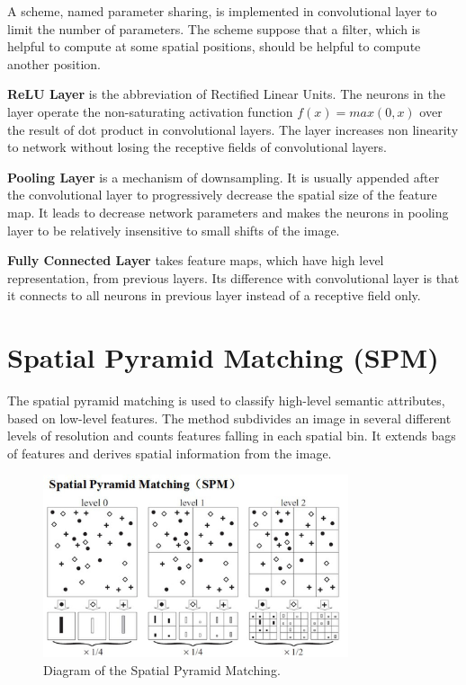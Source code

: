 A scheme, named parameter sharing, is implemented in convolutional layer to limit the number of parameters. The scheme suppose that a filter, which is helpful to compute at some spatial positions, should be helpful to compute another position.

\textbf{ReLU Layer} is the abbreviation of Rectified Linear Units. The neurons in the layer operate the non-saturating activation function $f(x) = max(0,x)$ over the result of dot product in convolutional layers. The layer increases non linearity to network without losing the receptive fields of convolutional layers.

\textbf{Pooling Layer} is a mechanism of downsampling. It is usually appended after the convolutional layer to progressively decrease the spatial size of the feature map. It leads to decrease network parameters and makes the neurons in pooling layer to be relatively insensitive to small shifts of the image.

\textbf{Fully Connected Layer} takes feature maps, which have high level representation, from previous layers. Its difference with convolutional layer is that it connects to all neurons in previous layer instead of a receptive field only.

\section{Spatial Pyramid Matching (SPM)}

The spatial pyramid matching\citep{lazebnik2006beyond} is used to classify high-level semantic attributes, based on low-level features. The method subdivides an image in several different levels of resolution and counts features falling in each spatial bin. It extends bags of features and derives spatial information from the image.
\graphicspath{ {./Figures/} }
\begin{figure}[!htb]
\centering
\includegraphics[width=0.8\textwidth]{spm.jpg}
\caption{\label{fig:SpatialPyramidMatching}Diagram of the Spatial Pyramid Matching\citep{lazebnik2006beyond}.}
\end{figure}

